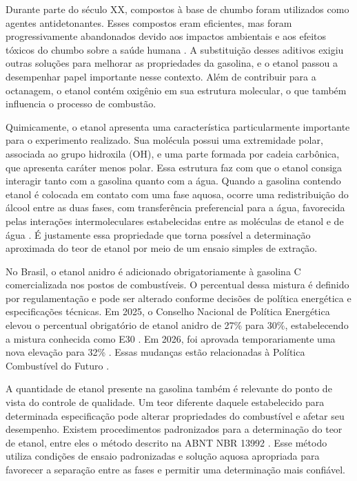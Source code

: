 \documentclass[11pt]{ifscarticle}
\begin{document}
Durante parte do século XX, compostos à base de chumbo foram utilizados como agentes antidetonantes. Esses compostos eram eficientes, mas foram progressivamente abandonados devido aos impactos ambientais e aos efeitos tóxicos do chumbo sobre a saúde humana \cite{baird2011}. A substituição desses aditivos exigiu outras soluções para melhorar as propriedades da gasolina, e o etanol passou a desempenhar papel importante nesse contexto. Além de contribuir para a octanagem, o etanol contém oxigênio em sua estrutura molecular, o que também influencia o processo de combustão.

Quimicamente, o etanol apresenta uma característica particularmente importante para o experimento realizado. Sua molécula possui uma extremidade polar, associada ao grupo hidroxila (OH), e uma parte formada por cadeia carbônica, que apresenta caráter menos polar. Essa estrutura faz com que o etanol consiga interagir tanto com a gasolina quanto com a água. Quando a gasolina contendo etanol é colocada em contato com uma fase aquosa, ocorre uma redistribuição do álcool entre as duas fases, com transferência preferencial para a água, favorecida pelas interações intermoleculares estabelecidas entre as moléculas de etanol e de água \cite{atkins2012,solomons2012}. É justamente essa propriedade que torna possível a determinação aproximada do teor de etanol por meio de um ensaio simples de extração.

No Brasil, o etanol anidro é adicionado obrigatoriamente à gasolina C comercializada nos postos de combustíveis. O percentual dessa mistura é definido por regulamentação e pode ser alterado conforme decisões de política energética e especificações técnicas. Em 2025, o Conselho Nacional de Política Energética elevou o percentual obrigatório de etanol anidro de 27\% para 30\%, estabelecendo a mistura conhecida como E30 \cite{cnpe9,mme_e30}. Em 2026, foi aprovada temporariamente uma nova elevação para 32\% \cite{cnpe2026}. Essas mudanças estão relacionadas à Política Combustível do Futuro \cite{leicombfuturo}.

A quantidade de etanol presente na gasolina também é relevante do ponto de vista do controle de qualidade. Um teor diferente daquele estabelecido para determinada especificação pode alterar propriedades do combustível e afetar seu desempenho. Existem procedimentos padronizados para a determinação do teor de etanol, entre eles o método descrito na ABNT NBR 13992 \cite{nbr13992}. Esse método utiliza condições de ensaio padronizadas e solução aquosa apropriada para favorecer a separação entre as fases e permitir uma determinação mais confiável.
\end{document}
